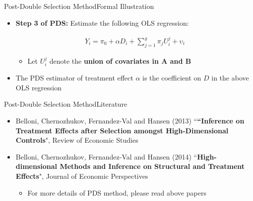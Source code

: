 \documentclass[dvipsnames,hyperref={pdfpagelabels=false}]{beamer}
\begin{document}
\begin{frame}{Post-Double Selection Method}{Formal Illustration}
\begin{itemize}

\item \textbf{Step 3 of PDS:} Estimate the following OLS regression:

\begin{eqnarray*}
	Y_{i} = \pi_{0} +  \alpha D_{i} + \sum^{g}_{j=1} \pi_{j} U^{j}_{i}  + \upsilon_{i}
\end{eqnarray*}	




	

\begin{itemize}
\item Let $U^{j}_{i}$ denote the \textbf{union of covariates in A and B}
\end{itemize}
	\vspace{0.3cm}
\item The PDS estimator of treatment effect $\alpha$ is the coefficient on $D$ in the above OLS regression



\end{itemize}



\end{frame}







\begin{frame}{Post-Double Selection Method}{Literature}
	
	\begin{itemize}
		
		\item[] Belloni, Chernozhukov, Fernandez-Val and Hansen (2013) ``\textbf{``Inference on Treatment Effects after Selection amongst High-Dimensional Controls}", Review of Economic Studies  
		\vspace{0.2cm}
		\item[] Belloni, Chernozhukov, Fernandez-Val and Hansen (2014) ``\textbf{High-dimensional Methods and Inference on Structural and Treatment Effects}", Journal of Economic Perspectives
		
		\begin{itemize}
			\vspace{0.2cm}
			\item For more details of PDS method, please read above papers
		\end{itemize}
	\end{itemize}
\end{frame}
\end{document}
